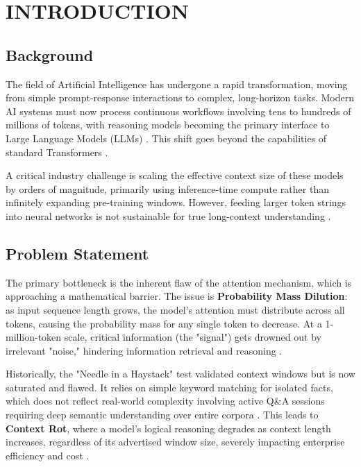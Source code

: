 
\chapter{INTRODUCTION}


\section{Background}
The field of Artificial Intelligence has undergone a rapid transformation, moving from simple prompt-response interactions to complex, long-horizon tasks. Modern AI systems must now process continuous workflows involving tens to hundreds of millions of tokens, with reasoning models becoming the primary interface to Large Language Models (LLMs) \cite{zhang2025}. This shift goes beyond the capabilities of standard Transformers \cite{vaswani2017}.

A critical industry challenge is scaling the effective context size of these models by orders of magnitude, primarily using inference-time compute rather than infinitely expanding pre-training windows. However, feeding larger token strings into neural networks is not sustainable for true long-context understanding \cite{zhang2025}.



\section{Problem Statement}
The primary bottleneck is the inherent flaw of the attention mechanism, which is approaching a mathematical barrier. The issue is \textbf{Probability Mass Dilution}: as input sequence length grows, the model's attention must distribute across all tokens, causing the probability mass for any single token to decrease. At a 1-million-token scale, critical information (the "signal") gets drowned out by irrelevant "noise," hindering information retrieval and reasoning \cite{vaswani2017, liu2024}.



Historically, the "Needle in a Haystack" test validated context windows but is now saturated and flawed. It relies on simple keyword matching for isolated facts, which does not reflect real-world complexity involving active Q\&A sessions requiring deep semantic understanding over entire corpora \cite{liu2024}. This leads to \textbf{Context Rot}, where a model's logical reasoning degrades as context length increases, regardless of its advertised window size, severely impacting enterprise efficiency and cost \cite{packer2024}.




